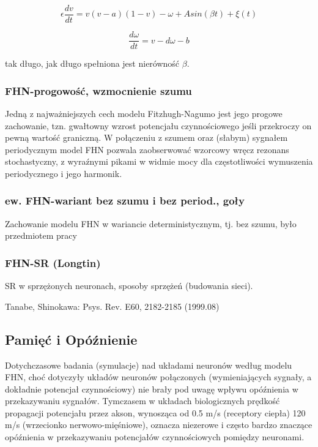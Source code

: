 \documentclass[12pt]{article}
\begin{document}
  \begin{equation}
    \epsilon \frac{dv}{dt} = v(v-a)(1-v)- \omega + A sin(\beta t) + \xi(t)
  \end{equation}

  \begin{equation}
    \frac{d \omega}{dt} = v - d \omega - b
  \end{equation}

  tak długo, jak długo spełniona jest nierówność $\beta$.

  \subsubsection{FHN-progowość, wzmocnienie szumu}

  Jedną z najważniejszych cech modelu Fitzhugh-Nagumo jest jego progowe zachowanie, tzn. gwałtowny wzrost potencjału czynnościowego jeśli przekroczy on pewną wartość graniczną. W połączeniu z szumem oraz (słabym) sygnałem periodycznym model FHN pozwala zaobserwować wzorcowy wręcz rezonans stochastyczny, z wyraźnymi pikami w widmie mocy dla częstotliwości wymuszenia periodycznego i jego harmonik.

  \subsubsection{ew. FHN-wariant bez szumu i bez period., goły}

  Zachowanie modelu FHN w wariancie deterministycznym, tj. bez szumu, było przedmiotem pracy \cite{alexander}

  \subsubsection{FHN-SR (Longtin)}
  SR w sprzężonych neuronach, sposoby sprzężeń (budowania sieci).

  Tanabe, Shinokawa: Psys. Rev. E60, 2182-2185 (1999.08)
  
  \subsection{Pamięć i Opóźnienie}
  
  Dotychczasowe badania (symulacje) nad układami neuronów według modelu FHN, choć dotyczyły układów neuronów połączonych (wymieniających sygnały, a dokładnie potencjał czynnościowy) nie brały pod uwagę wpływu opóźnienia w przekazywaniu sygnałów. Tymczasem w układach biologicznych prędkość propagacji potencjału przez akson, wynosząca od 0.5 m/s (receptory ciepła) 120 m/s (wrzecionko nerwowo-mięśniowe), oznacza niezerowe i często bardzo znaczące opóźnienia w przekazywaniu potencjałów czynnościowych pomiędzy neuronami.
\end{document}
